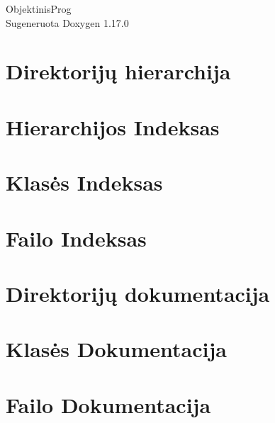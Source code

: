 \documentclass[twoside]{book}
\newcommand{\+}{\discretionary{\mbox{\scriptsize$\hookleftarrow$}}{}{}}
\newcommand{\clearemptydoublepage}{%
    \newpage{\pagestyle{empty}\cleardoublepage}%
  }
\begin{document}
  \raggedbottom
    \hypersetup{pageanchor=false,
                bookmarksnumbered=true,
                pdfencoding=unicode
               }
  \begin{titlepage}
  \vspace*{7cm}
  \begin{center}%
  {\Large Objektinis\+Prog}\\
  \vspace*{1cm}
  {\large Sugeneruota Doxygen 1.17.0}\\
  \end{center}
  \end{titlepage}
  \clearemptydoublepage
  \tableofcontents
  \clearemptydoublepage
  \hypersetup{pageanchor=true}

\chapter{Direktorijų hierarchija}

\chapter{Hierarchijos Indeksas}

\chapter{Klasės Indeksas}

\chapter{Failo Indeksas}

\chapter{Direktorijų dokumentacija}


\chapter{Klasės Dokumentacija}


\chapter{Failo Dokumentacija}






  \backmatter
  \newpage
  \clearemptydoublepage
  \printindex
\end{document}
